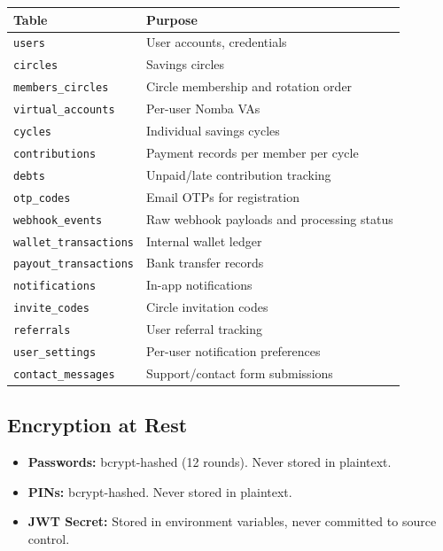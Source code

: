 \documentclass[11pt,a4paper]{article}
\begin{document}
\begin{table}[h]
  \centering
  \small
  \begin{tabular}{ll}
    \toprule
    Table & Purpose \\
    \midrule
    \texttt{users}              & User accounts, credentials \\
    \texttt{circles}            & Savings circles \\
    \texttt{members\_circles}   & Circle membership and rotation order \\
    \texttt{virtual\_accounts}  & Per-user Nomba VAs \\
    \texttt{cycles}             & Individual savings cycles \\
    \texttt{contributions}      & Payment records per member per cycle \\
    \texttt{debts}              & Unpaid/late contribution tracking \\
    \texttt{otp\_codes}         & Email OTPs for registration \\
    \texttt{webhook\_events}    & Raw webhook payloads and processing status \\
    \texttt{wallet\_transactions} & Internal wallet ledger \\
    \texttt{payout\_transactions} & Bank transfer records \\
    \texttt{notifications}      & In-app notifications \\
    \texttt{invite\_codes}      & Circle invitation codes \\
    \texttt{referrals}          & User referral tracking \\
    \texttt{user\_settings}     & Per-user notification preferences \\
    \texttt{contact\_messages}  & Support/contact form submissions \\
    \bottomrule
  \end{tabular}
\end{table}

\subsection{Encryption at Rest}

\begin{itemize}[nosep]
  \item \textbf{Passwords:} bcrypt-hashed (12 rounds). Never stored in
        plaintext.
  \item \textbf{PINs:} bcrypt-hashed. Never stored in plaintext.
  \item \textbf{JWT Secret:} Stored in environment variables, never
        committed to source control.
\end{itemize}
\end{document}
